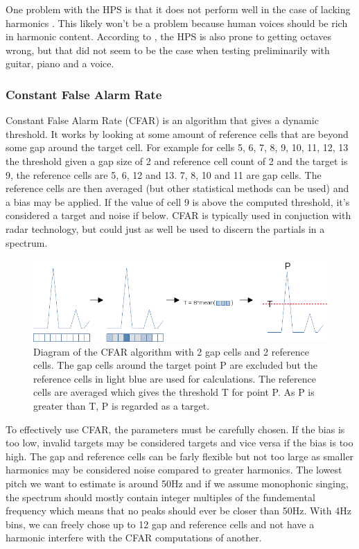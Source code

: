 One problem with the HPS is that it does not perform well in the case of lacking harmonics \cite{McLeod2008}. This likely won't be a problem because human voices should be rich in harmonic content. According to \cite{Smyth2019}, the HPS is also prone to getting octaves wrong, but that did not seem to be the case when testing preliminarily with guitar, piano and a voice.

\subsubsection{Constant False Alarm Rate}
Constant False Alarm Rate (CFAR) is an algorithm that gives a dynamic threshold. It works by looking at some amount of reference cells that are beyond some gap around the target cell. For example for cells 5, 6, 7, 8, 9, 10, 11, 12, 13 the threshold given a gap size of 2 and reference cell count of 2 and the target is 9, the reference cells are 5, 6, 12 and 13. 7, 8, 10 and 11 are gap cells. The reference cells are then averaged (but other statistical methods can be used) and a bias may be applied. If the value of cell 9 is above the computed threshold, it's considered a target and noise if below. CFAR is typically used in conjuction with radar technology, but could just as well be used to discern the partials in a spectrum. 

\begin{figure}[ht]
    \centering
    \includegraphics[width=\textwidth]{./images/cfar.png}
    \caption{Diagram of the CFAR algorithm with 2 gap cells and 2 reference cells. The gap cells around the target point P are excluded but the reference cells in light blue are used for calculations. The reference cells are averaged which gives the threshold T for point P. As P is greater than T, P is regarded as a target.\label{fig:cfar}}
\end{figure}

To effectively use CFAR, the parameters must be carefully chosen. If the bias is too low, invalid targets may be considered targets and vice versa if the bias is too high. The gap and reference cells can be farly flexible but not too large as smaller harmonics may be considered noise compared to greater harmonics. The lowest pitch we want to estimate is around 50Hz and if we assume monophonic singing, the spectrum should mostly contain integer multiples of the fundemental frequency which means that no peaks should ever be closer than 50Hz. With 4Hz bins, we can freely chose up to 12 gap and reference cells and not have a harmonic interfere with the CFAR computations of another. 


